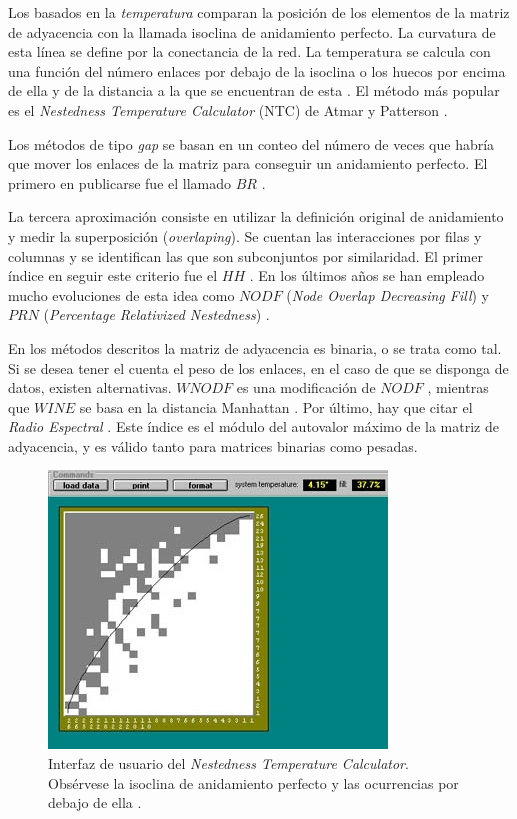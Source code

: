 Los basados en la \textit{temperatura} comparan la posición de los elementos de la matriz de adyacencia con la llamada isoclina de anidamiento perfecto. La curvatura de esta línea se define por la conectancia de la red. La temperatura se calcula con una función del número enlaces por debajo de la isoclina o los huecos por encima de ella y de la distancia a la que se encuentran de esta \cite{ulrich2007null}. El método más popular es el \textit{Nestedness Temperature Calculator} (NTC) de Atmar y Patterson \cite{atmar1995nestedness}.

Los métodos de tipo \textit{gap} se basan en un conteo del número de veces que habría que mover los enlaces de la matriz para conseguir un anidamiento perfecto. El primero en publicarse fue el llamado $BR$ \cite{brualdi1999nested}.

La tercera aproximación consiste en utilizar la definición original de anidamiento y medir la superposición (\textit{overlaping}). Se cuentan las interacciones por filas y columnas y se identifican las que son subconjuntos por similaridad. El primer índice en seguir este criterio fue el $HH$ \cite{hausdorf2003nestedness}. En los últimos años se han empleado mucho evoluciones de esta idea como $NODF$ (\textit{Node Overlap Decreasing Fill}) \cite{almeida2008consistent} y $PRN$ (\textit{Percentage Relativized Nestedness}) \cite{podani2012comparative}.

En los métodos descritos la matriz de adyacencia es binaria, o se trata como tal. Si se desea tener el cuenta el peso de los enlaces, en el
caso de que se disponga de datos, existen alternativas. $WNODF$ es una modificación de $NODF$ \cite{almeida2011straightforward}, mientras que $WINE$ se basa en la distancia Manhattan \cite{galeano2009weighted}. Por último, hay que citar el \textit{Radio Espectral} \cite{staniczenko2013ghost}. Este índice es el módulo del autovalor máximo de la matriz de adyacencia, y es válido tanto para matrices binarias como pesadas. 

\begin{figure}[h!]
\centering
\includegraphics[scale=0.66]{Figures/ESTATICA_nested_subsets.jpg}
\caption{Interfaz de usuario del \textit{Nestedness Temperature Calculator}. Obsérvese la isoclina de anidamiento perfecto y las ocurrencias por debajo de ella \cite{atmar1995nestedness}.}
\label{fig:ESTATICA_nested_subsets}
\end{figure}

